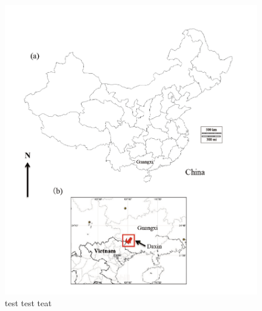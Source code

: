 %

\begin{figure}
  \centering
    \label{fig:fig2_1}
  \includegraphics[scale=1]{Figures/Fig21.pdf}
  \caption[test caption]{test test teat}
\end{figure}

